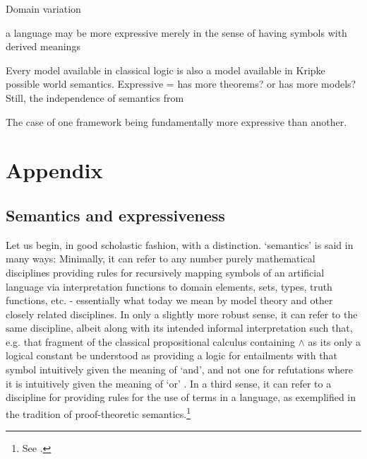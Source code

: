 \documentclass[]{article}
\begin{document}



Domain variation

a language may be more expressive merely in the sense of having symbols with derived meanings 

Every model available in classical logic is also a model available in Kripke possible world semantics.
Expressive = has more theorems? or has more models?
Still, the independence of semantics from 




The case of one framework being fundamentally more expressive than another.
\section{Appendix}
\subsection{Semantics and expressiveness}
Let us begin, in good scholastic fashion, with a distinction.
`semantics' is said in many ways: 
Minimally, it can refer to any number purely mathematical disciplines providing rules for recursively mapping symbols of an artificial language via interpretation functions to domain elements, sets, types, truth functions, etc. - essentially what today we mean by model theory and other closely related disciplines. 
In only a slightly more robust sense, 
it can refer to the same discipline, 
albeit along with its intended informal interpretation such that, 
e.g. that fragment of the classical propositional calculus containing $\wedge$ as its only a logical constant be understood as providing a logic for entailments with that symbol intuitively given the meaning of `and', 
and not one for refutations where it is intuitively given the meaning of `or' .
In a third sense, 
it can refer to a discipline for providing rules for the use of terms in a language, as exemplified in the tradition of proof-theoretic semantics.\footnote{See \autocite{Francez2016b,Read2010,Schroeder-Heister2006}.} 
\end{document}
